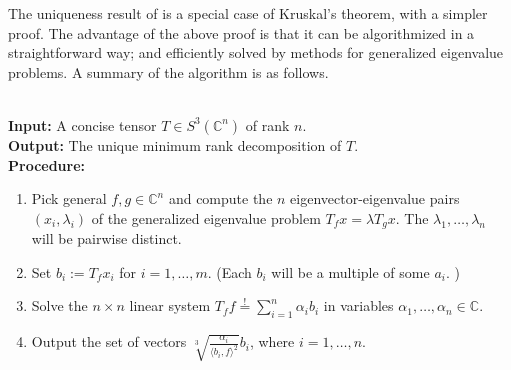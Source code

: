 The uniqueness result of is a special case of Kruskal's theorem, with a simpler proof. The advantage of the above proof is that it can be algorithmized in a straightforward way; and efficiently solved by methods for generalized eigenvalue problems.
A summary of the algorithm is as follows. 

\begin{algorithm}
	\label{tensorAlgorithms-algorithm-3tensor}
	\hfill\\
	\textbf{Input: } A concise tensor $ T\in S^3(\mathbb C^n) $ of rank $ n $. \\
	\textbf{Output: } The unique minimum rank decomposition of $ T $. \\
	\textbf{Procedure: } \\
	\begin{enumerate}
		\item Pick general $ f, g\in \mathbb{C}^n $ and compute the $ n $ eigenvector-eigenvalue pairs $ (x_i, \lambda_i) $ of the generalized eigenvalue problem $ T_{f}x = \lambda T_{g}x $. The $ \lambda_1,\ldots,\lambda_n $ will be pairwise distinct. 
		\item Set $ b_i := T_fx_i $ for $ i = 1,\ldots,m $.	(Each $ b_i $ will be a multiple of some $ a_i $. )
		\item Solve the $ n\times n $ linear system $ T_f f \stackrel{!}{=} \sum_{i = 1}^{n} \alpha_i b_i $ in variables $ \alpha_1,\ldots,\alpha_n\in \mathbb{C} $. 
		\item Output the set of vectors $ \sqrt[3]{\frac{\alpha_i}{\langle b_i, f \rangle^2}} b_i $, where $ i = 1,\ldots,n $. 
	\end{enumerate}
\end{algorithm}
